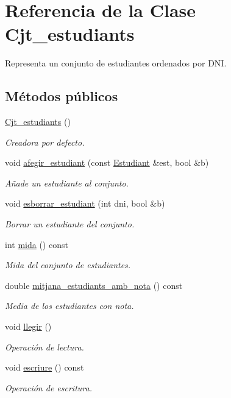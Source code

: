 \hypertarget{class_cjt__estudiants}{}\section{Referencia de la Clase Cjt\+\_\+estudiants}
\label{class_cjt__estudiants}


Representa un conjunto de estudiantes ordenados por D\+NI.  


\subsection*{Métodos públicos}
\begin{DoxyCompactItemize}
\item 
\hyperlink{class_cjt__estudiants_a31ffe72cadcf58d82c8b9f6659c56e7a}{Cjt\+\_\+estudiants} ()
\begin{DoxyCompactList}\small\item\em Creadora por defecto. \end{DoxyCompactList}\item 
void \hyperlink{class_cjt__estudiants_a4188715904e017fa15b9ad8bc63112b6}{afegir\+\_\+estudiant} (const \hyperlink{class_estudiant}{Estudiant} \&est, bool \&b)
\begin{DoxyCompactList}\small\item\em Añade un estudiante al conjunto. \end{DoxyCompactList}\item 
void \hyperlink{class_cjt__estudiants_a6632e0cecaa9d698cb51da07c9e58402}{esborrar\+\_\+estudiant} (int dni, bool \&b)
\begin{DoxyCompactList}\small\item\em Borrar un estudiante del conjunto. \end{DoxyCompactList}\item 
int \hyperlink{class_cjt__estudiants_a87c69704a0eff48a301cfff05e6dd587}{mida} () const
\begin{DoxyCompactList}\small\item\em Mida del conjunto de estudiantes. \end{DoxyCompactList}\item 
double \hyperlink{class_cjt__estudiants_a8c8099d5080864a677743e5e1d1bbdf8}{mitjana\+\_\+estudiants\+\_\+amb\+\_\+nota} () const
\begin{DoxyCompactList}\small\item\em Media de los estudiantes con nota. \end{DoxyCompactList}\item 
void \hyperlink{class_cjt__estudiants_aa24c2d4c36167b2b810ab459435b67a8}{llegir} ()
\begin{DoxyCompactList}\small\item\em Operación de lectura. \end{DoxyCompactList}\item 
void \hyperlink{class_cjt__estudiants_a2c25dbd33850025de3389617712f896a}{escriure} () const
\begin{DoxyCompactList}\small\item\em Operación de escritura. \end{DoxyCompactList}\end{DoxyCompactItemize}
